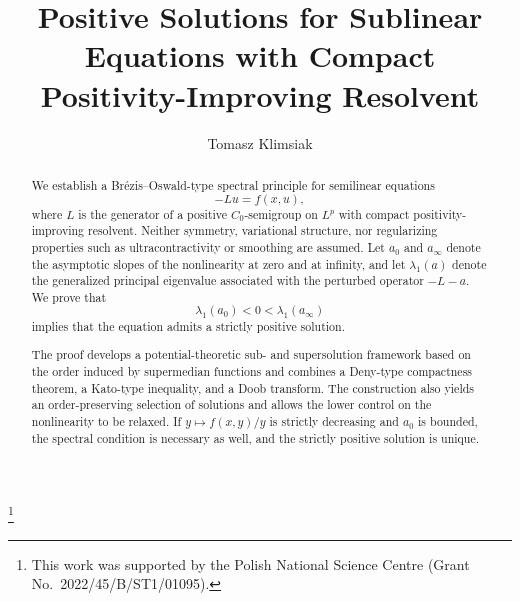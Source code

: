 \documentclass[11pt,a4paper,reqno]{amsart}
\theoremstyle{definition}
\numberwithin{equation}{section}
\begin{document}
\title[Positive solutions: sublinear equations]{Positive Solutions for 
Sublinear Equations with Compact Positivity-Improving Resolvent}

\author[T. Klimsiak]{Tomasz Klimsiak}

\thanks{This work was supported by the Polish National Science Centre
(Grant No.~2022/45/B/ST1/01095).}


\address{
Faculty of Mathematics and Computer Science,
Nicolaus Copernicus University in Toru\'n,
Chopina 12/18,
87-100 Toru\'n,
Poland
}







\begin{abstract}
We establish a Br\'ezis--Oswald-type spectral principle for semilinear
equations
\[
-Lu=f(x,u),
\]
where $L$ is the generator of a positive $C_0$-semigroup on $L^p$ with
compact positivity-improving resolvent. Neither symmetry, variational
structure, nor regularizing properties such as ultracontractivity or
smoothing are assumed. Let $a_0$ and $a_\infty$ denote the asymptotic
slopes of the nonlinearity at zero and at infinity, and let
$\lambda_1(a)$ denote the generalized principal eigenvalue associated
with the perturbed operator $-L-a$. We prove that
\[
\lambda_1(a_0)<0<\lambda_1(a_\infty)
\]
implies that the equation admits a strictly positive solution.

The proof develops a potential-theoretic sub- and supersolution framework
based on the order induced by supermedian functions and combines a
Deny-type compactness theorem, a Kato-type inequality, and a Doob
transform. The construction also yields an order-preserving selection of
solutions and allows the lower control on the nonlinearity to be relaxed.
If $y\mapsto f(x,y)/y$ is strictly decreasing and $a_0$ is bounded, the
spectral condition is necessary as well, and the strictly positive
solution is unique.


\end{abstract}

\maketitle
\end{document}
